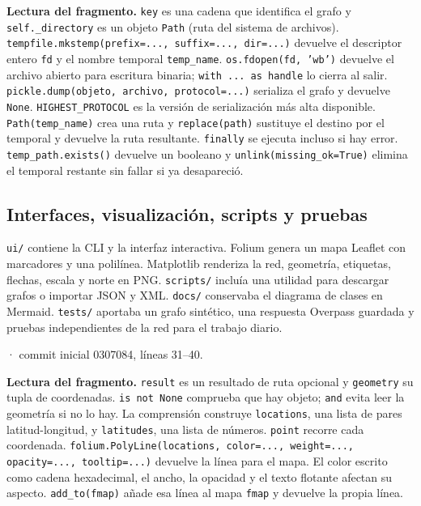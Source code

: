 \documentclass[11pt,a4paper]{article}
\begin{document}
\textbf{Lectura del fragmento.} \texttt{key} es una cadena que identifica el grafo y \texttt{self.\_directory} es un objeto \texttt{Path} (ruta del sistema de archivos). \texttt{tempfile.mkstemp(prefix=..., suffix=..., dir=...)} devuelve el descriptor entero \texttt{fd} y el nombre temporal \texttt{temp\_name}. \texttt{os.fdopen(fd, 'wb')} devuelve el archivo abierto para escritura binaria; \texttt{with ... as handle} lo cierra al salir. \texttt{pickle.dump(objeto, archivo, protocol=...)} serializa el grafo y devuelve \texttt{None}. \texttt{HIGHEST\_PROTOCOL} es la versión de serialización más alta disponible. \texttt{Path(temp\_name)} crea una ruta y \texttt{replace(path)} sustituye el destino por el temporal y devuelve la ruta resultante. \texttt{finally} se ejecuta incluso si hay error. \texttt{temp\_path.exists()} devuelve un booleano y \texttt{unlink(missing\_ok=True)} elimina el temporal restante sin fallar si ya desapareció.


\subsection{Interfaces, visualización, scripts y pruebas}
\texttt{ui/} contiene la CLI y la interfaz interactiva. Folium genera un mapa Leaflet con marcadores y una polilínea. Matplotlib renderiza la red, geometría, etiquetas, flechas, escala y norte en PNG. \texttt{scripts/} incluía una utilidad para descargar grafos o importar JSON y XML. \texttt{docs/} conservaba el diagrama de clases en Mermaid. \texttt{tests/} aportaba un grafo sintético, una respuesta Overpass guardada y pruebas independientes de la red para el trabajo diario.

\smallskip
{\footnotesize\texttt{} · commit inicial 0307084, líneas 31--40.}\par
{}

\textbf{Lectura del fragmento.} \texttt{result} es un resultado de ruta opcional y \texttt{geometry} su tupla de coordenadas. \texttt{is not None} comprueba que hay objeto; \texttt{and} evita leer la geometría si no lo hay. La comprensión construye \texttt{locations}, una lista de pares latitud-longitud, y \texttt{latitudes}, una lista de números. \texttt{point} recorre cada coordenada. \texttt{folium.PolyLine(locations, color=..., weight=..., opacity=..., tooltip=...)} devuelve la línea para el mapa. El color escrito como cadena hexadecimal, el ancho, la opacidad y el texto flotante afectan su aspecto. \texttt{add\_to(fmap)} añade esa línea al mapa \texttt{fmap} y devuelve la propia línea.
\end{document}
